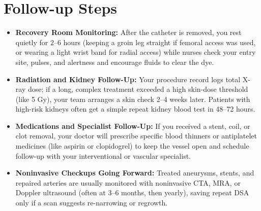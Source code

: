 \section{Follow-up Steps}
\begin{itemize}
\item \textbf{Recovery Room Monitoring:} After the catheter is removed, you rest quietly for 2--6 hours (keeping a groin leg straight if femoral access was used, or wearing a light wrist band for radial access) while nurses check your entry site, pulses, and alertness and encourage fluids to clear the dye.
\item \textbf{Radiation and Kidney Follow-Up:} Your procedure record logs total X-ray dose; if a long, complex treatment exceeded a high skin-dose threshold (like 5 Gy), your team arranges a skin check 2--4 weeks later. Patients with high-risk kidneys often get a simple repeat kidney blood test in 48--72 hours.
\item \textbf{Medications and Specialist Follow-Up:} If you received a stent, coil, or clot removal, your doctor will prescribe specific blood thinners or antiplatelet medicines (like aspirin or clopidogrel) to keep the vessel open and schedule follow-up with your interventional or vascular specialist.
\item \textbf{Noninvasive Checkups Going Forward:} Treated aneurysms, stents, and repaired arteries are usually monitored with noninvasive CTA, MRA, or Doppler ultrasound (often at 3--6 months, then yearly), saving repeat DSA only if a scan suggests re-narrowing or regrowth.
\end{itemize}

